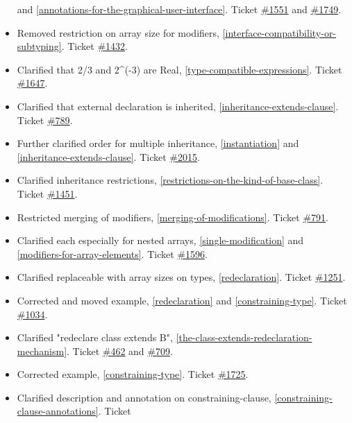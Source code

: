\begin{itemize}
  and \autoref{annotations-for-the-graphical-user-interface}. Ticket
  \href{https://trac.modelica.org/Modelica/ticket/1551}{\#1551} and
  \href{https://trac.modelica.org/Modelica/ticket/1749}{\#1749}.
\item
  Removed restriction on array size for modifiers, \autoref{interface-compatibility-or-subtyping}. Ticket
  \href{https://trac.modelica.org/Modelica/ticket/1432}{\#1432}.
\item
  Clarified that 2/3 and 2\^{}(-3) are Real, \autoref{type-compatible-expressions}. Ticket
  \href{https://trac.modelica.org/Modelica/ticket/1647}{\#1647}.
\item
  Clarified that external declaration is inherited, \autoref{inheritance-extends-clause}. Ticket
  \href{https://trac.modelica.org/Modelica/ticket/789}{\#789}.
\item
  Further clarified order for multiple inheritance, \autoref{instantiation} and
  \autoref{inheritance-extends-clause}. Ticket
  \href{https://trac.modelica.org/Modelica/ticket/2015}{\#2015}.
\item
  Clarified inheritance restrictions, \autoref{restrictions-on-the-kind-of-base-class}. Ticket
  \href{https://trac.modelica.org/Modelica/ticket/1451}{\#1451}.
\item
  Restricted merging of modifiers, \autoref{merging-of-modifications}. Ticket
  \href{https://trac.modelica.org/Modelica/ticket/791}{\#791}.
\item
  Clarified each especially for nested arrays, \autoref{single-modification} and \autoref{modifiers-for-array-elements}.
  Ticket \href{https://trac.modelica.org/Modelica/ticket/1596}{\#1596}.
\item
  Clarified replaceable with array sizes on types, \autoref{redeclaration}. Ticket
  \href{https://trac.modelica.org/Modelica/ticket/1251}{\#1251}.
\item
  Corrected and moved example, \autoref{redeclaration} and \autoref{constraining-type}. Ticket
  \href{https://trac.modelica.org/Modelica/ticket/1034}{\#1034}.
\item
  Clarified "redeclare class extends B", \autoref{the-class-extends-redeclaration-mechanism}. Ticket
  \href{https://trac.modelica.org/Modelica/ticket/462}{\#462} and
  \href{https://trac.modelica.org/Modelica/ticket/709}{\#709}.
\item
  Corrected example, \autoref{constraining-type}. Ticket
  \href{https://trac.modelica.org/Modelica/ticket/1725}{\#1725}.
\item
  Clarified description and annotation on constraining-clause, \autoref{constraining-clause-annotations}. Ticket

\end{itemize}
